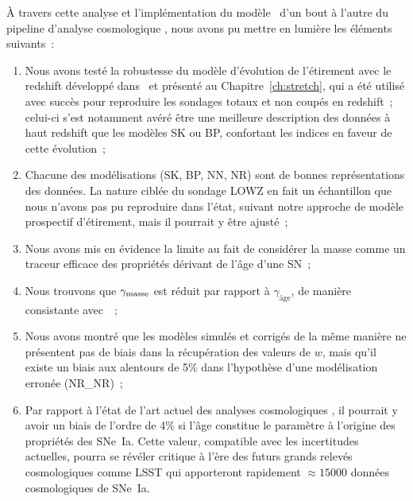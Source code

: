 \documentclass[../main/main.tex]{subfiles}
\begin{document}
À travers cette analyse et l'implémentation du modèle~
d'un bout à l'autre du pipeline d'analyse cosmologique \snana, nous
avons pu mettre en lumière les éléments suivants~:
\begin{enumerate}
    \item Nous avons testé la robustesse du modèle d'évolution de l'étirement
        avec le redshift développé dans~\cite{nicolas2021} et présenté au
        Chapitre~\ref{ch:stretch}, qui a été utilisé avec succès pour reproduire
        les sondages totaux et non coupés en redshift~; celui-ci s'est notamment
        avéré être une meilleure description des données à haut redshift que les
        modèles SK ou BP, confortant les indices en faveur de cette évolution~;
    \item Chacune des modélisations (SK, BP, NN, NR) sont de bonnes
        représentations des données. La nature ciblée du sondage LOWZ en fait
        un échantillon que nous n'avons pas pu reproduire dans l'état, suivant
        notre approche de modèle prospectif d'étirement, mais il pourrait y être
        ajusté~;
    \item Nous avons mis en évidence la limite au fait de considérer la masse
        comme un traceur efficace des propriétés dérivant de l'âge d'une SN~;
    \item Nous trouvons que $\gamma_{\rm masse}$ est réduit par rapport à
        $\gamma_\text{âge}$, de manière consistante avec~\cite{briday2022}~;
    \item Nous avons montré que les modèles simulés et corrigés de la même
        manière ne présentent pas de biais dans la récupération des valeurs de
        $w$, mais qu'il existe un biais aux alentours de 5\% dans l'hypothèse
        d'une modélisation erronée (NR\_NR)~;
    \item Par rapport à l'état de l'art actuel des analyses cosmologiques
        , il pourrait y avoir un biais de l'ordre de
        4\% si l'âge constitue le paramètre à l'origine des propriétés des
        SNe~Ia. Cette valeur, compatible avec les incertitudes actuelles, pourra
        se révéler critique à l'ère des futurs grands relevés cosmologiques
        comme LSST qui apporteront rapidement $\approx \num{15000}$ données
        cosmologiques de SNe~Ia.
\end{enumerate}
\end{document}
